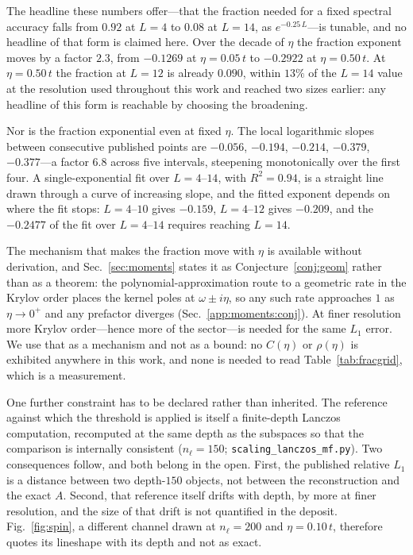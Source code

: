 The headline these numbers offer---that the fraction needed for a fixed spectral accuracy falls
from $0.92$ at $L=4$ to $0.08$ at $L=14$, as $e^{-0.25\,L}$---is tunable, and no headline of that form
is claimed here. Over the decade of $\eta$ the fraction exponent moves by a factor $2.3$, from
$-0.1269$ at $\eta=0.05\,t$ to $-0.2922$ at $\eta=0.50\,t$. At $\eta=0.50\,t$ the fraction at $L=12$
is already $0.090$, within $13\%$ of the $L=14$ value at the resolution used throughout this work and
reached two sizes earlier: any headline of this form is reachable by choosing the broadening.

Nor is the fraction exponential even at fixed $\eta$. The local logarithmic slopes between consecutive
published points are $-0.056$, $-0.194$, $-0.214$, $-0.379$, $-0.377$---a factor $6.8$ across five
intervals, steepening monotonically over the first four. A single-exponential fit over $L=4$--$14$, with $R^{2}=0.94$, is a straight line drawn through a curve of increasing slope, and the fitted exponent depends on where the fit stops:
$L=4$--$10$ gives $-0.159$, $L=4$--$12$ gives $-0.209$, and the $-0.2477$ of the fit over $L=4$--$14$ requires reaching
$L=14$.

The mechanism that makes the fraction move with $\eta$ is available without derivation, and
Sec.~\ref{sec:moments} states it as Conjecture~\ref{conj:geom} rather than as a theorem:
the polynomial-approximation route to a geometric rate in the Krylov order places the kernel poles at
$\omega\pm i\eta$, so any such rate approaches $1$ as $\eta\to0^{+}$ and any prefactor diverges
(Sec.~\ref{app:moments:conj}). At finer resolution more Krylov order---hence more of the sector---is
needed for the same $L_1$ error. We use that as a mechanism and not as a bound: no $C(\eta)$ or
$\rho(\eta)$ is exhibited anywhere in this work, and none is needed to read Table~\ref{tab:fracgrid},
which is a measurement.

One further constraint has to be declared rather than inherited. The reference against which the
threshold is applied is itself a finite-depth Lanczos computation, recomputed at the same depth as the
subspaces so that the comparison is internally consistent ($n_\ell=150$;
\texttt{scaling\_lanczos\_mf.py}). Two consequences follow, and both belong in the open. First, the
published relative $L_1$ is a distance between two depth-$150$ objects, not between the reconstruction
and the exact $A$. Second, that reference itself drifts with depth, by more at finer resolution, and the size of that
drift is not quantified in the deposit. Fig.~\ref{fig:spin}, a different channel drawn at
$n_\ell=200$ and $\eta=0.10\,t$, therefore quotes its lineshape with its depth and not as exact.

